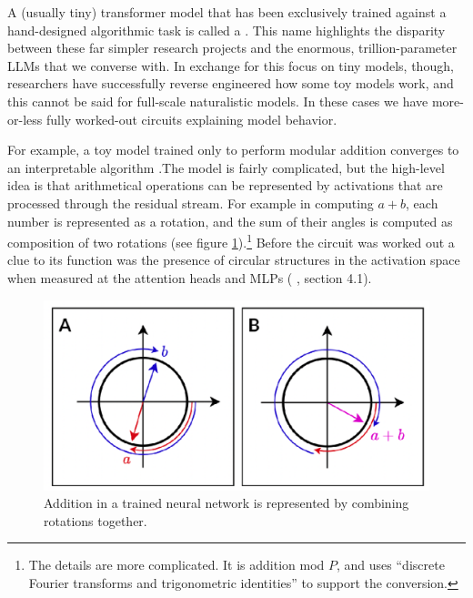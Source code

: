 A (usually tiny) transformer model that has been exclusively trained against a
hand-designed algorithmic task is called a . This name
highlights the disparity between these far simpler research projects and the
enormous, trillion-parameter LLMs that we converse with. In exchange for this
focus on tiny models, though, researchers have successfully reverse engineered
how some toy models work, and this cannot be said for full-scale naturalistic
models. In these cases we have more-or-less fully worked-out circuits
explaining model behavior.

For example, a toy model trained only to perform modular addition converges to
an interpretable algorithm \cite{nanda2023progress}.The model is fairly
complicated, but the high-level idea is that arithmetical operations can be
represented by activations that are processed through the residual stream. For
example in computing $a + b$, each number is represented as a rotation, and the
sum of their angles is computed as composition of two rotations (see figure
\ref{toyModelAddition}).\footnote{The details are more complicated. It is
addition mod $P$, and uses ``discrete Fourier transforms and trigonometric
identities'' \cite{nanda2023progress} to support the conversion.} Before the
circuit was worked out a clue to its function was the presence of circular
structures in the activation space when measured at the attention heads and
MLPs (\cite{nanda2023progress} , section 4.1).

\begin{figure}[ht]
\centering
\includegraphics[scale=.4]{./images/toyModelAddition.png}
\caption[From \cite{nanda2023progress} .]{
      Addition in a trained neural network is represented by combining
      rotations together.
}
\label{toyModelAddition}
\end{figure}


